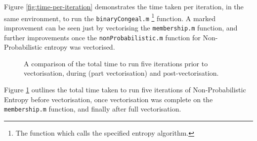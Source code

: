 Figure \ref{fig:time-per-iteration} demonstrates the time taken per iteration, in the same environment, to run the \texttt{binaryCongeal.m} \footnote{The function which calls the specified entropy algorithm.} function. A marked improvement can be seen just by vectorising the \texttt{membership.m} function, and further improvements once the \texttt{nonProbabilistic.m} function for Non-Probabilistic entropy was vectorised.

\begin{figure}[H]
  \begin{center}
    \caption{A comparison of the total time to run five iterations prior to vectorisation, during (part vectorisation) and post-vectorisation.}
    \label{fig:total-time}
  \end{center}
\end{figure}

Figure \ref{fig:total-time} outlines the total time taken to run five iterations of Non-Probabilistic Entropy before vectorisation, once vectorisation was complete on the \texttt{membership.m} function, and finally after full vectorisation.
